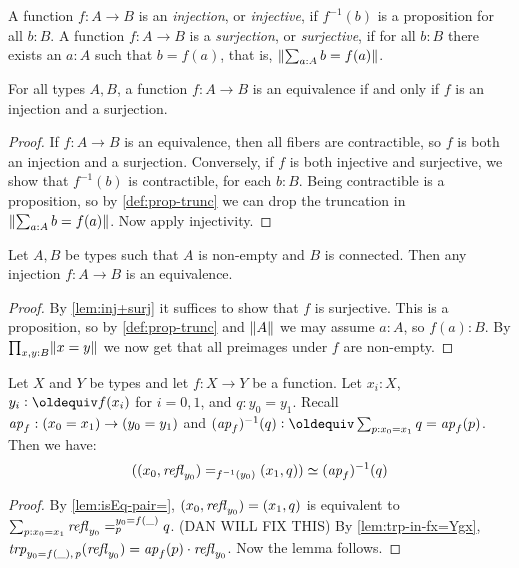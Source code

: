 \begin{definition}
\begin{definition}\label{def:injection}
A function $f:A\to B$ is an \emph{injection}, or \emph{injective}, 
if $f^{-1}(b)$ is a proposition for all $b:B$.
A function $f:A\to B$ is a \emph{surjection}, or \emph{surjective},
if for all $b:B$ there exists an $a:A$ such that $b=f(a)$,
that is, $\lVert\sum_{a:A} b=f(a)\rVert$.

\end{definition}

\begin{lemma}\label{lem:inj+surj}
For all types $A,B$, a function $f: A\to B$ is an equivalence 
if and only if $f$ is an injection and a surjection.
\end{lemma}

\begin{proof}
If $f: A\to B$ is an equivalence, then all fibers are contractible,
so $f$ is both an injection and a surjection. Conversely,
if $f$ is both injective and surjective, we show that
$f^{-1}(b)$ is contractible, for each $b:B$. 
Being contractible is a proposition, so by \cref{def:prop-trunc}
we can drop the truncation in $\lVert\sum_{a:A} b=f(a)\rVert$.
Now apply injectivity.
\end{proof}

\begin{corollary}\label{cor:inj+connected}
Let $A,B$ be types such that $A$ is non-empty and $B$ is connected.
Then any injection $f: A\to B$ is an equivalence.
\end{corollary}
\begin{proof}
By \cref{lem:inj+surj} it suffices to show that $f$ is surjective.
This is a proposition, so by \cref{def:prop-trunc} and $\lVert A\rVert$
we may assume $a:A$, so $f(a):B$. By $\prod_{x,y:B} \lVert x=y\rVert$
we now get that all preimages under $f$ are non-empty.
\end{proof}

\begin{lemma}\label{lem:fib-vs-path}
Let $X$ and $Y$ be types and let $f:X\to Y$ be a function.
Let $x_i:X$, $y_i\defeq f(x_i)$ for $i=0,1$, and $q:y_0 = y_1$.
Recall $\mathop{{\it ap}_{f}}: (x_0=x_1) \to (y_0 = y_1)$ and
$(\ap{f})^{-1}(q) \defeq \sum_{p:x_0=x_1} q =\ap{f}(p)$.
Then we have:
\[
((x_0,\mathop{{\it refl}_{y_0}})=_{f^{-1}(y_0)}(x_1,q))\simeq (\mathop{{\it ap}_{f}})^{-1}(q)
\]
\end{lemma}
\begin{proof}
By \cref{lem:isEq-pair=},
$(x_0,\mathop{{\it refl}_{y_0}})=(x_1,q)$ is equivalent to
$\sum_{p:x_0=x_1} \mathop{{\it refl}_{y_0}} =^{y_0=f(\_)}_{p} q$.
(DAN WILL FIX THIS)
By \cref{lem:trp-in-fx=Ygx}, $\mathop{\mathit{trp}_{y_0=f(\_),\,p}}(\mathop{{\it refl}_{y_0}}) =
\mathop{{\it ap}_{f}}(p) \cdot \mathop{{\it refl}_{y_0}}$. Now the lemma follows.
\end{proof}


\end{definition}
